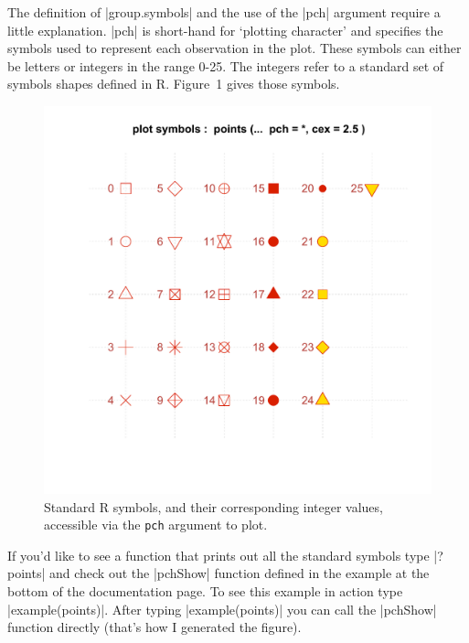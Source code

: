 
The definition of |group.symbols| and the use of the |pch| argument require a little explanation. |pch| is short-hand for `plotting  character' and specifies the symbols used to represent each observation in the plot.  These symbols can either be letters or integers in the range 0-25. The integers refer to a standard set of symbols shapes defined in R. Figure~1 gives those symbols.

\begin{figure}
\begin{center}

\includegraphics[height=0.8\columnwidth]{./figures/hands-on8/pch-symbols}

\end{center}
\caption{Standard R symbols, and their corresponding integer values, accessible via the \texttt{pch} argument to plot.}
\end{figure}

If you'd like to see a function that prints out all the standard symbols type |?points| and check out the |pchShow| function defined in the example at the bottom of the documentation page.  To see this example in action type |example(points)|. After typing |example(points)| you can call the |pchShow| function directly (that's how I generated the figure).

